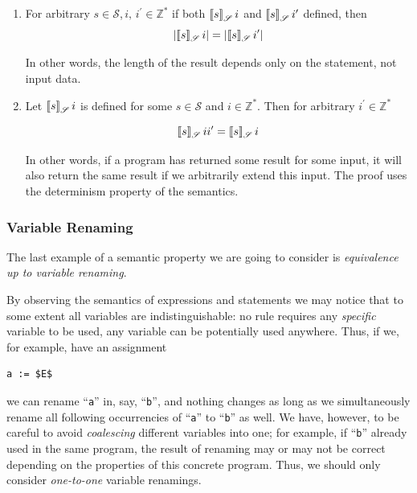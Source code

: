 \begin{enumerate}
\item For arbitrary $s\in\mathscr{S}$,$\,i,\,i^\prime\in\mathbb{Z}^*$ if both $\sembr{s}^\ph_\mathscr{S}\,i$ and $\sembr{s}^\ph_\mathscr{S}\,i^\prime$ defined, then
  \[
  |\sembr{s}^\ph_\mathscr{S}\,i|=|\sembr{s}^\ph_\mathscr{S}\,i^\prime|
  \]

  In other words, the length of the result depends only on the statement, not input data.

\item
  Let $\sembr{s}^\ph_\mathscr{S}\,i$ is defined for some $s\in\mathscr{S}$ and $i\in\mathbb{Z}^*$. Then for arbitrary $i^\prime\in\mathbb{Z}^*$

  \[
   \sembr{s}^\ph_\mathscr{S}\,ii^\prime=\sembr{s}^\ph_\mathscr{S}\,i
   \]

   In other words, if a program has returned some result for some input, it will also return the same result
   if we arbitrarily extend this input. The proof uses the determinism property of the semantics.
\end{enumerate}

\subsubsection{Variable Renaming}

The last example of a semantic property we are going to consider is \emph{equivalence up to variable renaming}.

By observing the semantics of expressions and statements we may notice that to some extent all variables
are indistinguishable: no rule requires any \emph{specific} variable to be used, any variable can be potentially used
anywhere. Thus, if we, for example, have an assignment

\begin{lstlisting}[mathescape=true]
   a := $E$
\end{lstlisting}

we can rename ``\lstinline|a|'' in, say, ``\lstinline|b|'', and nothing changes as long as we simultaneously
rename all following occurrencies of ``\lstinline|a|'' to ``\lstinline|b|'' as well. We have, however, to be
careful to avoid  \emph{coalescing} different variables into one; for example, if ``\lstinline|b|'' already
used in the same program, the result of renaming may or may not be correct depending on the properties
of this concrete program. Thus, we should only consider \emph{one-to-one} variable renamings.


